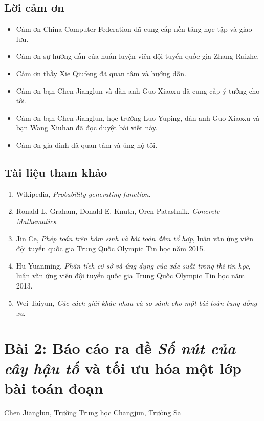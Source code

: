 \documentclass[11pt]{article}
\begin{document}
\subsection*{Lời cảm ơn}

\begin{itemize}
  \item Cảm ơn China Computer Federation đã cung cấp nền tảng học tập và giao
  lưu.
  \item Cảm ơn sự hướng dẫn của huấn luyện viên đội tuyển quốc gia Zhang
  Ruizhe.
  \item Cảm ơn thầy Xie Qiufeng đã quan tâm và hướng dẫn.
  \item Cảm ơn bạn Chen Jianglun và đàn anh Guo Xiaoxu đã cung cấp ý tưởng cho
  tôi.
  \item Cảm ơn bạn Chen Jianglun, học trưởng Luo Yuping, đàn anh Guo Xiaoxu và
  bạn Wang Xiuhan đã đọc duyệt bài viết này.
  \item Cảm ơn gia đình đã quan tâm và ủng hộ tôi.
\end{itemize}

\subsection*{Tài liệu tham khảo}

\begin{enumerate}
  \item Wikipedia, \emph{Probability-generating function}.
  \item Ronald L. Graham, Donald E. Knuth, Oren Patashnik. \emph{Concrete
  Mathematics}.
  \item Jin Ce, \emph{Phép toán trên hàm sinh và bài toán đếm tổ hợp}, luận văn
  ứng viên đội tuyển quốc gia Trung Quốc Olympic Tin học năm 2015.
  \item Hu Yuanming, \emph{Phân tích cơ sở và ứng dụng của xác suất trong thi
  tin học}, luận văn ứng viên đội tuyển quốc gia Trung Quốc Olympic Tin học năm
  2013.
  \item Wei Taiyun, \emph{Các cách giải khác nhau và so sánh cho một bài toán
  tung đồng xu}.
\end{enumerate}

\section{Bài 2: Báo cáo ra đề \emph{Số nút của cây hậu tố} và tối ưu hóa một lớp bài toán đoạn}

\begin{center}
Chen Jianglun, Trường Trung học Changjun, Trường Sa
\end{center}
\end{document}
